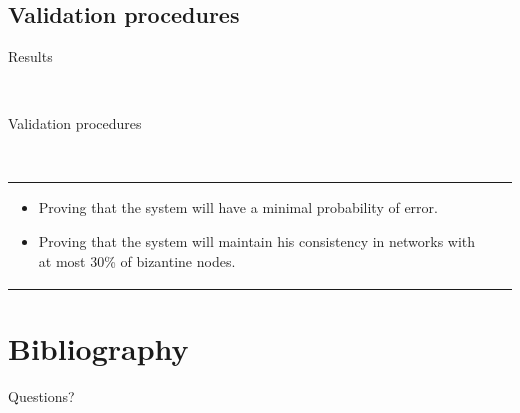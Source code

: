 \documentclass[12pt]{beamer}
\renewcommand{\frametitle}[1]{\vspace{0.2cm}\begin{huge}#1\end{huge}\\}
\renewcommand{\framesubtitle}[1]{\vspace{0.4cm} \hspace{0.4cm}\begin{large}#1\end{large}\\}
\begin{document}
  \subsection{Validation procedures}
    \begin{frame}
    \frametitle{Results}
    \framesubtitle{Validation procedures}
    \begin{table}
    \begin{tabular}{p{7cm}p{3cm}}
      \begin{itemize}
          \item Proving that the system will have a minimal probability of error.
          \item Proving that the system will  maintain his consistency in networks with at most 30\% of bizantine nodes. 
      \end{itemize}
    &
    \vspace{1.5cm}
    \end{tabular}
    \end{table}
    \end{frame}

  \section{Bibliography}
\frame
{
	\vspace{2cm}
	\begin{center}
		\Large{Questions?}
	\end{center}
}
\end{document}
